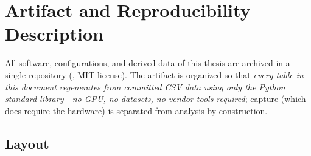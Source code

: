 \chapter{Artifact and Reproducibility Description}
\label{app:artifacts}

All software, configurations, and derived data of this thesis are archived
in a single repository (, MIT
license). The artifact is organized so that \emph{every table in this
document regenerates from committed CSV data using only the Python standard
library---no GPU, no datasets, no vendor tools required}; capture (which
does require the hardware) is separated from analysis by construction.

\section{Layout}

